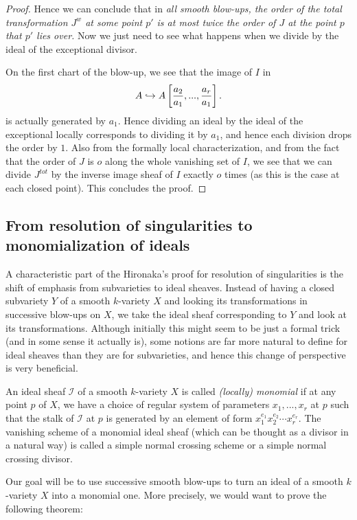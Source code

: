 \documentclass[12pt,a4paper,leqno]{article}
\theoremstyle{plain}
\theoremstyle{definition}
\theoremstyle{remark}
\begin{document}
\begin{proof}
Hence we can conclude that in \emph{all smooth blow-ups, the order of the total transformation $J^w$ at some point $p'$ is at most twice the order of $J$ at the point $p$ that $p'$ lies over.} Now we just need to see what happens when we divide by the ideal of the exceptional divisor.

On the first chart of the blow-up, we see that the image of $I$ in
\begin{equation*}
A \hookrightarrow A \left[ {a_2 \over a_1}, ... , {a_r \over a_1} \right].
\end{equation*}
is actually generated by $a_1$. Hence dividing an ideal by the ideal of the exceptional locally corresponds to dividing it by $a_1$, and hence each division drops the order by $1$. Also from the formally local characterization, and from the fact that the order of $J$ is $o$ along the whole vanishing set of $I$, we see that we can divide $J^{tot}$ by the inverse image sheaf of $I$ exactly $o$ times (as this is the case at each closed point). This concludes the proof.  
\end{proof} 
 
\subsection{From resolution of singularities to monomialization of ideals} 

A characteristic part of the Hironaka's proof for resolution of singularities is the shift of emphasis from subvarieties to ideal sheaves. Instead of having a closed subvariety $Y$ of a smooth $k$-variety $X$ and looking its transformations in successive blow-ups on $X$, we take the ideal sheaf corresponding to $Y$ and look at its transformations. Although initially this might seem to be just a formal trick (and in some sense it actually is), some notions are far more natural to define for ideal sheaves than they are for subvarieties, and hence this change of perspective is very beneficial.  

An ideal sheaf $\mathscr{I}$ of a smooth $k$-variety $X$ is called \emph{(locally) monomial} if at any point $p$ of $X$, we have a choice of regular system of parameters $x_1,...,x_r$ at $p$ such that the stalk of $\mathscr{I}$ at $p$ is generated by an element of form $x_1^{e_1} x_2^{e_2} \cdots x_r^{e_r}$. The vanishing scheme of a monomial ideal sheaf (which can be thought as a divisor in a natural way) is called a simple normal crossing scheme or a simple normal crossing divisor.

Our goal will be to use successive smooth blow-ups to turn an ideal of a smooth $k$-variety $X$ into a monomial one. More precisely, we would want to prove the following theorem:
\end{document}
